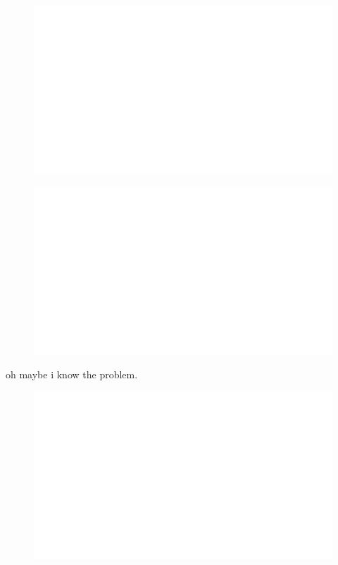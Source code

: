 \begin{centering}
    \begin{figure}[h!]
        \centering
        \includegraphics[width=\textwidth]{whyareyoucheckingthenameofthisfile.png}
    \end{figure}
\end{centering}

\noindent
\begin{centering}
    \begin{figure}[h]
        \centering
        \includegraphics[width=\textwidth]{whyareyoucheckingthenameofthisfile.png}
    \end{figure}
\end{centering}

oh maybe i know the problem.

\noindent
\begin{centering}
    \begin{figure}[h]
        \centering
        \includegraphics[width=\textwidth]{whyareyoucheckingthenameofthisfile.png}
    \end{figure}
\end{centering}

